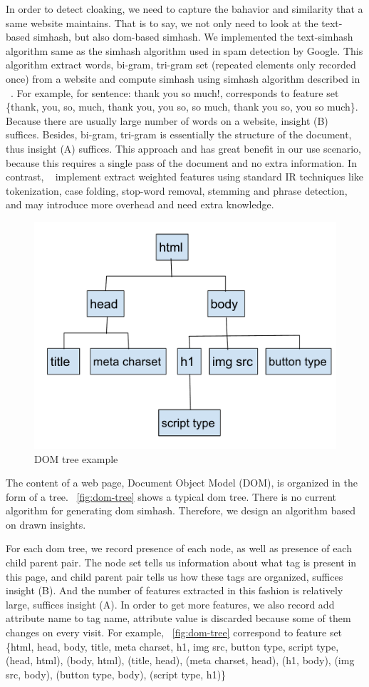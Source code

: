 In order to detect cloaking, we need to capture the bahavior and similarity that
a same website maintains. That is to say, we not only need to look at the text-based simhash,
but also dom-based simhash. We implemented the text-simhash algorithm 
same as the simhash algorithm used in spam detection by Google.
This algorithm extract words, bi-gram, tri-gram set
(repeated elements only recorded once) from a website and compute simhash using
simhash algorithm described in ~\cite{charikar2002similarity}. For example, for
sentence: thank you so much!, corresponds to feature set \{thank, you, so, much,
thank you, you so, so much, thank you so, you so much\}.
Because there are usually large number of words on a website, insight (B)
suffices. Besides, bi-gram, tri-gram is essentially the structure of the document,
thus insight (A) suffices.
This approach
and has great benefit in our use scenario, because this requires a single pass
of the document and no extra information. In contrast,
~\cite{manku2007detecting} implement extract weighted features using standard IR
techniques like tokenization, case folding, stop-word removal, stemming and
phrase detection, and may introduce more overhead and need extra knowledge.

\begin{figure}[t]
  \centering
  \includegraphics[width=.5\textwidth]{fig/dom-tree}
  \caption{DOM tree example}
  \label{fig:dom-tree}
\end{figure}

The content of a web page, Document Object Model (DOM), is organized in the form of a tree.
~\autoref{fig:dom-tree} shows a typical dom tree.
There is no current algorithm for generating dom simhash. Therefore, we design
an algorithm based on drawn insights.

For each dom tree, we record presence of each node, as
well as presence of each child parent pair. The node set tells us information about what
tag is present in this page, and child parent pair tells us how these tags are
organized, suffices insight (B). And the number of features extracted in this
fashion is relatively large, suffices insight (A). In order to get more
features, we also record add attribute name to tag name, attribute value is
discarded because some of them changes on every visit. For example,
~\autoref{fig:dom-tree} correspond to feature set \{html, head, body, title,
  meta charset, h1, img src, button type, script type, (head, html), (body,
  html), (title, head), (meta charset, head), (h1, body), (img src, body),
(button type, body), (script type, h1)\}

